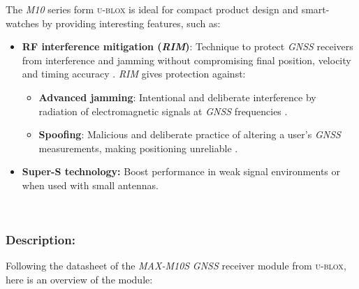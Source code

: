 \documentclass[report.tex]{subfiles}
\begin{document}
The \textit{M10} series form \textsc{u-blox} is ideal for compact product design and smart-watches by providing interesting features, such as: 
\begin{itemize}
\item \textbf{RF interference mitigation (\textit{RIM})}: Technique to protect \textit{GNSS} receivers from interference and jamming without compromising final position, velocity and timing accuracy \cite{rf_inter_mit}. \textit{RIM} gives protection against:
\begin{itemize}
\item \textbf{Advanced jamming}: Intentional and deliberate interference by radiation of electromagnetic signals at \textit{GNSS} frequencies \cite{jamming}.
\item \textbf{Spoofing}: Malicious and deliberate practice of altering a user's \textit{GNSS} measurements, making positioning unreliable \cite{spoofing}.
\end{itemize}
\item \textbf{Super-S technology:} Boost performance in weak signal environments or when used with small antennas.
\end{itemize}

\;\\[-60pt]
\subsubsection{Description:}

Following the datasheet\cite{MAXM10S} of the \textit{MAX-M10S} \textit{GNSS} receiver module from \textsc{u-blox}, here is an overview of the module:
\end{document}
